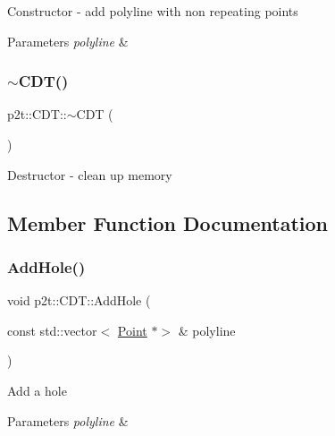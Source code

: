 Constructor -\/ add polyline with non repeating points


\begin{DoxyParams}{Parameters}
{\em polyline} & \\
\hline
\end{DoxyParams}
\mbox{\label{classp2t_1_1CDT_af1b16e2c9ad6d145f953ddbe721c7cb4}} 
\subsubsection{\texorpdfstring{$\sim$\+C\+D\+T()}{~CDT()}\hspace{0.1cm}{\footnotesize\ttfamily [2/2]}}
{\footnotesize\ttfamily p2t\+::\+C\+D\+T\+::$\sim$\+C\+DT (\begin{DoxyParamCaption}{ }\end{DoxyParamCaption})}

Destructor -\/ clean up memory 

\subsection{Member Function Documentation}
\mbox{\label{classp2t_1_1CDT_abb1e1cdbfefa8053421c1bb6ac49c909}} 
\subsubsection{\texorpdfstring{Add\+Hole()}{AddHole()}\hspace{0.1cm}{\footnotesize\ttfamily [1/2]}}
{\footnotesize\ttfamily void p2t\+::\+C\+D\+T\+::\+Add\+Hole (\begin{DoxyParamCaption}\item[{const std\+::vector$<$ \hyperlink{structp2t_1_1Point}{Point} $\ast$$>$ \&}]{polyline }\end{DoxyParamCaption})}

Add a hole


\begin{DoxyParams}{Parameters}
{\em polyline} & \\
\hline
\end{DoxyParams}
\mbox{\label{classp2t_1_1CDT_abb1e1cdbfefa8053421c1bb6ac49c909}} 

